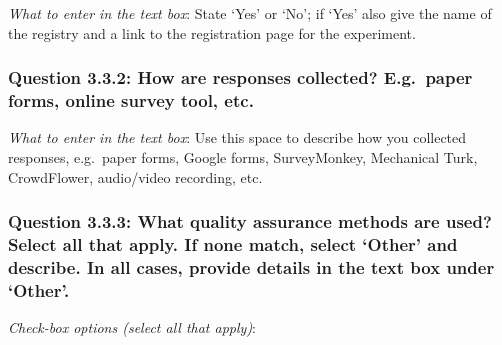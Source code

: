 \documentclass[11pt,a4paper]{article}
\begin{document}
\noindent\textit{What to enter in the text box}: State `Yes' or `No'; if `Yes' also give the name of the registry and a link to the registration page for the experiment.

\subsubsection*{Question 3.3.2: How are responses collected? E.g.\ paper forms, online survey tool, etc.}

\noindent\textit{What to enter in the text box}: Use this space to describe how you collected responses, e.g.\ paper forms, Google forms, SurveyMonkey, Mechanical Turk, CrowdFlower, audio/video recording, etc. 

\subsubsection*{Question 3.3.3:  What quality assurance methods are used? Select all that apply.   If none match, select `Other' and describe. In all cases, provide details in the text box under `Other'.}
\vspace{-.1cm}

\vspace{.3cm}
\noindent\textit{Check-box options (select all that apply)}:  
\vspace{-.1cm}
\end{document}
